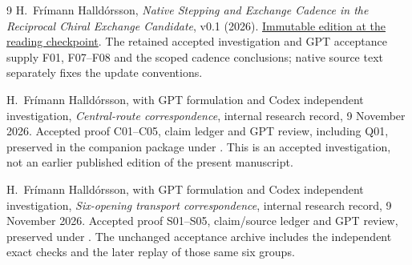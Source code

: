\begin{thebibliography}{9}
 H.~Frímann Halldórsson,
\emph{Native Stepping and Exchange Cadence in the Reciprocal Chiral Exchange Candidate}, v0.1 (2026).
\href{https://github.com/pzychozen/trioctagon-physics/tree/c3ee366bd6195bd7fa77efd0321214af4c2dc173/papers/NATIVE_F_STEPPING_EXCHANGE_CADENCE/publication/v0.1}{Immutable edition at the reading checkpoint}.
The retained accepted investigation and GPT acceptance supply F01, F07--F08 and the scoped cadence conclusions; native source text separately fixes the update conventions.

 H.~Frímann Halldórsson, with GPT formulation and Codex independent investigation,
\emph{Central-route correspondence}, internal research record, 9 November 2026.
Accepted proof C01--C05, claim ledger and GPT review, including Q01, preserved in the companion package under . This is an accepted investigation, not an earlier published edition of the present manuscript.

 H.~Frímann Halldórsson, with GPT formulation and Codex independent investigation,
\emph{Six-opening transport correspondence}, internal research record, 9 November 2026.
Accepted proof S01--S05, claim/source ledger and GPT review, preserved under . The unchanged acceptance archive includes the independent exact checks and the later replay of those same six groups.
\end{thebibliography}
